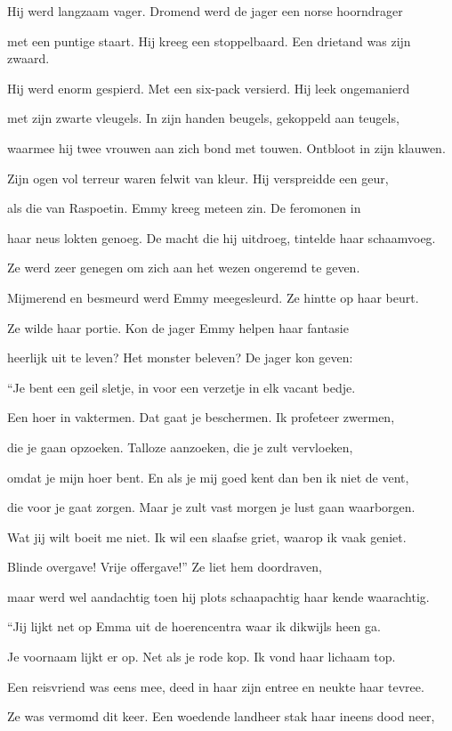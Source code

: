 Hij werd langzaam vager.
Dromend werd de jager
een norse hoorndrager

met een puntige staart.
Hij kreeg een stoppelbaard.
Een drietand was zijn zwaard.

Hij werd enorm gespierd.
Met een six-pack versierd.
Hij leek ongemanierd

met zijn zwarte vleugels.
In zijn handen beugels,
gekoppeld aan teugels,

waarmee hij twee vrouwen
aan zich bond met touwen.
Ontbloot in zijn klauwen.

Zijn ogen vol terreur
waren felwit van kleur.
Hij verspreidde een geur,

als die van Raspoetin.
Emmy kreeg meteen zin.
De feromonen in

haar neus lokten genoeg.
De macht die hij uitdroeg,
tintelde haar schaamvoeg.

Ze werd zeer genegen
om zich aan het wezen
ongeremd te geven.

Mijmerend en besmeurd
werd Emmy meegesleurd.
Ze hintte op haar beurt.

Ze wilde haar portie.
Kon de jager Emmy
helpen haar fantasie

heerlijk uit te leven?
Het monster beleven?
De jager kon geven:

“Je bent een geil sletje,
in voor een verzetje
in elk vacant bedje.

Een hoer in vaktermen.
Dat gaat je beschermen.
Ik profeteer zwermen,

die je gaan opzoeken.
Talloze aanzoeken,
die je zult vervloeken,

omdat je mijn hoer bent.
En als je mij goed kent
dan ben ik niet de vent,

die voor je gaat zorgen.
Maar je zult vast morgen
je lust gaan waarborgen.

Wat jij wilt boeit me niet.
Ik wil een slaafse griet,
waarop ik vaak geniet.

Blinde overgave!
Vrije offergave!”
Ze liet hem doordraven,

maar werd wel aandachtig
toen hij plots schaapachtig
haar kende waarachtig.

“Jij lijkt net op Emma
uit de hoerencentra
waar ik dikwijls heen ga.

Je voornaam lijkt er op.
Net als je rode kop.
Ik vond haar lichaam top.

Een reisvriend was eens mee,
deed in haar zijn entree
en neukte haar tevree.

Ze was vermomd dit keer.
Een woedende landheer
stak haar ineens dood neer,

